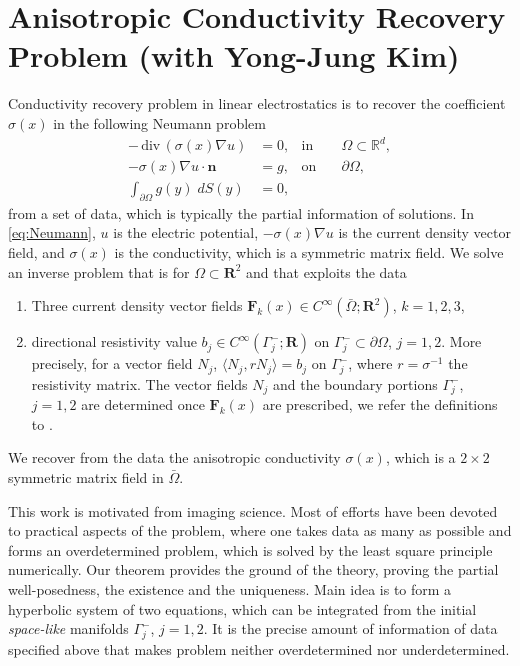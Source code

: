\documentclass[a4paper,11pt]{article}
\def\div{\,\textrm{div}\,}
\def\F{\mathbf{F}}
\begin{document}
\section{Anisotropic Conductivity Recovery Problem {\small(with Yong-Jung Kim)}}
Conductivity recovery problem in linear electrostatics is to recover the coefficient $\sigma(x)$ in the following Neumann problem
\begin{equation}\label{eq:Neumann}
\begin{aligned}
 -\div(\sigma(x)\nabla u) &=0, &\text{in} \quad & \Omega\subset \mathbb{R}^d,\\
 -\sigma(x)\nabla u \cdot \mathbf{n} &=g, &\text{on} \quad & \partial\Omega,\\
 \int_{\partial\Omega} g(y) \;dS(y) &=0,
\end{aligned}
\end{equation}
from a set of data, which is typically the partial information of solutions. In \eqref{eq:Neumann}, $u$ is the electric potential, $-\sigma(x)\nabla u$ is the current density vector field, and $\sigma(x)$ is the conductivity, which is a symmetric matrix field. We solve an inverse problem that is for $\Omega\subset \mathbf{R}^2$ and that exploits the data 
\begin{enumerate}
 \item Three current density vector fields $\F_k(x) \in C^\infty(\bar\Omega;\mathbf{R}^2)$, $k=1,2,3$,
 \item directional resistivity value $b_j\in C^\infty(\Gamma_j^-;\mathbf{R})$ on $\Gamma_j^-\subset\partial\Omega$, $j=1,2$. More precisely, for a vector field $N_j$, $\langle N_j, rN_j\rangle = b_j$ on $\Gamma_j^-$, where $r=\sigma^{-1}$ the resistivity matrix. The vector fields $N_j$ and the boundary portions $\Gamma_j^-$, $j=1,2$ are determined once $\F_k(x)$ are prescribed, we refer the definitions to \cite{lee_well-posedness_2014}.
\end{enumerate}
We recover from the data the anisotropic conductivity $\sigma(x)$, which is a $2\times2$ symmetric matrix field in $\bar\Omega$. 

This work is motivated from imaging science. Most of efforts have been devoted to practical aspects of the problem, where one takes data as many as possible and forms an overdetermined problem, which is solved by the least square principle numerically. Our theorem provides the ground of the theory, proving the partial well-posedness, the existence and the uniqueness. Main idea is to form a hyperbolic system of two equations, which can be integrated from the initial {\it space-like} manifolds $\Gamma_j^-$, $j=1,2$. It is the precise amount of information of data specified above that makes problem neither overdetermined nor underdetermined.
\end{document}
